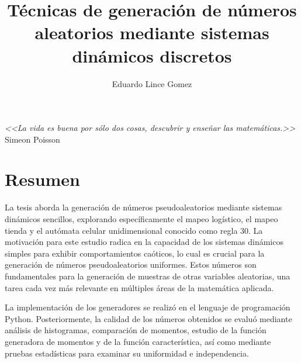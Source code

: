\documentclass[letterpaper,spanish,12pt]{book}
\author{Eduardo Lince Gomez}
\title{Técnicas de generación
de números aleatorios mediante sistemas dinámicos discretos}
\theoremstyle{remark}
\begin{document}
\frontmatter
\maketitle %

\chapter*{}
\begin{flushright}
	{%
	\selectfont\emph{<<La vida es buena por sólo dos cosas, descubrir y enseñar las matemáticas.>>}\\
\vspace{5mm}
	Simeon Poisson}

\end{flushright}
\vfill
\chapter{Resumen}
La tesis aborda la generación de números pseudoaleatorios mediante sistemas dinámicos sencillos, explorando específicamente el mapeo logístico, el mapeo tienda y el autómata celular unidimensional conocido como regla 30. La motivación para este estudio radica en la  capacidad de los sistemas dinámicos simples para exhibir comportamientos caóticos, lo cual es crucial para la generación de números pseudoaleatorios uniformes. Estos números son fundamentales para la generación de muestras de otras variables aleatorias, una tarea cada vez más relevante en múltiples áreas de la matemática aplicada.

La implementación de los generadores se realizó en el lenguaje de programación Python. Posteriormente, la calidad de los números obtenidos se evaluó mediante análisis de histogramas, comparación de momentos, estudio de la función generadora de momentos y de la función característica, así como mediante pruebas estadísticas para examinar su uniformidad e independencia.
\end{document}
